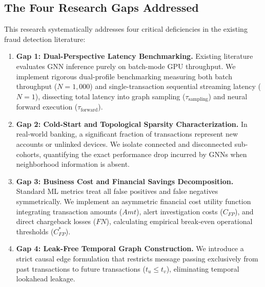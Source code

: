 \documentclass[11pt,a4paper]{report}
\begin{document}
\subsection{The Four Research Gaps Addressed}
This research systematically addresses four critical deficiencies in the existing fraud detection literature:
\begin{enumerate}[leftmargin=*]
    \item \textbf{Gap 1: Dual-Perspective Latency Benchmarking.} Existing literature evaluates GNN inference purely on batch-mode GPU throughput. We implement rigorous dual-profile benchmarking measuring both batch throughput ($N=1,000$) and single-transaction sequential streaming latency ($N=1$), dissecting total latency into graph sampling ($\tau_{\text{sampling}}$) and neural forward execution ($\tau_{\text{forward}}$).
    \item \textbf{Gap 2: Cold-Start and Topological Sparsity Characterization.} In real-world banking, a significant fraction of transactions represent new accounts or unlinked devices. We isolate connected and disconnected sub-cohorts, quantifying the exact performance drop incurred by GNNs when neighborhood information is absent.
    \item \textbf{Gap 3: Business Cost and Financial Savings Decomposition.} Standard ML metrics treat all false positives and false negatives symmetrically. We implement an asymmetric financial cost utility function integrating transaction amounts ($Amt$), alert investigation costs ($C_{FP}$), and direct chargeback losses ($FN$), calculating empirical break-even operational thresholds ($C_{FP}^*$).
    \item \textbf{Gap 4: Leak-Free Temporal Graph Construction.} We introduce a strict causal edge formulation that restricts message passing exclusively from past transactions to future transactions ($t_u \leq t_v$), eliminating temporal lookahead leakage.
\end{enumerate}
\end{document}
